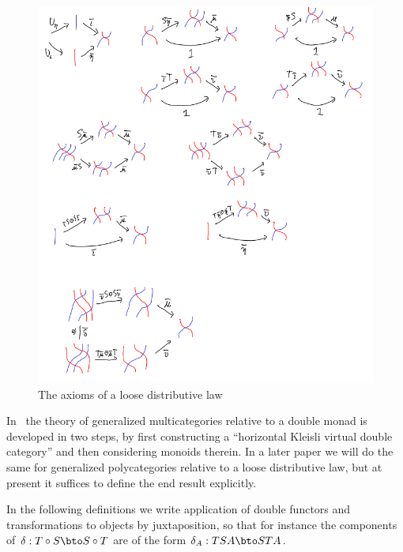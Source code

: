\documentclass{amsart}
\let\oc\circ
\newcommand{\dl}{\delta}
\begin{document}
\begin{figure}
  \centering
  \includegraphics[width=\textwidth]{hdl-axioms.png}
  \caption{The axioms of a loose distributive law}
  \label{fig:hdl-axioms}
\end{figure}

In~\cite{cs:genmulti} the theory of generalized multicategories relative to a double monad is developed in two steps, by first constructing a ``horizontal Kleisli virtual double category'' and then considering monoids therein.
In a later paper we will do the same for generalized polycategories relative to a loose distributive law, but at present it suffices to define the end result explicitly.

In the following definitions we write application of double functors and transformations to objects by juxtaposition, so that for instance the components of $\dl:T\oc S \bto S \oc T$ are of the form $\dl_A : T S A \bto S T A$.
\end{document}
